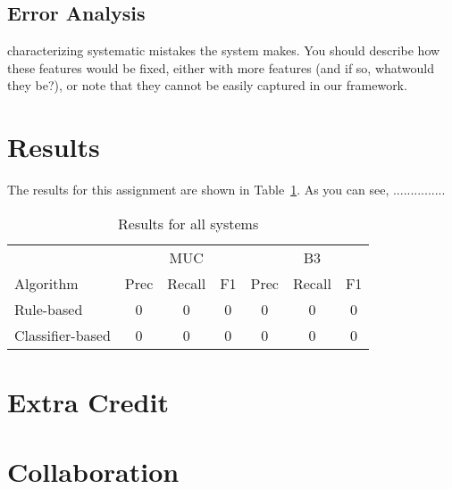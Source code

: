 \documentclass[12pt, twocolumn]{article}
\begin{document}
\subsection{Error Analysis}
characterizing systematic mistakes the system makes. You should describe how these features
would be fixed, either with more features (and if so, whatwould they be?), or note that they cannot be easily captured
in our framework.
\section{Results}
The results for this assignment are shown in Table~\ref{tab:results}. As you can see, ...............
\begin{table}[b]
\begin{minipage}{\textwidth}
\centering
\begin{tabular}{l|c c c|c c c}
\hline
& & MUC & & & B3 & \\
Algorithm & Prec & Recall & F1 & Prec & Recall & F1 \\\hline
Rule-based & 0 & 0 & 0 & 0 & 0 & 0\\\hline  
Classifier-based & 0 & 0 & 0 & 0 & 0 & 0\\\hline
\end{tabular}
\caption{Results for all systems}\label{tab:results}
\end{minipage}
\end{table}


\section{Extra Credit}

\section{Collaboration} 
\end{document}
